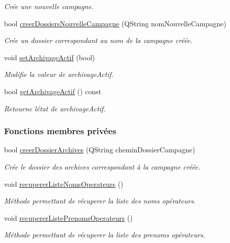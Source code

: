 \begin{DoxyCompactItemize}
\begin{DoxyCompactList}\small\item\em Crée une nouvelle campagne. \end{DoxyCompactList}\item 
bool \hyperlink{class_rov_a970f36e93f9dbd22734db571b21ceb04}{creer\+Dossiers\+Nouvelle\+Campagne} (Q\+String nom\+Nouvelle\+Campagne)
\begin{DoxyCompactList}\small\item\em Crée un dossier correspondant au nom de la campagne créée. \end{DoxyCompactList}\item 
void \hyperlink{class_rov_abbe2eb87a00b651c8259c0c7abca3edd}{set\+Archivage\+Actif} (bool)
\begin{DoxyCompactList}\small\item\em Modifie la valeur de archivage\+Actif. \end{DoxyCompactList}\item 
bool \hyperlink{class_rov_ac24b94eaac569252bdc0b1919489a761}{get\+Archivage\+Actif} () const
\begin{DoxyCompactList}\small\item\em Retourne l\textquotesingle{}état de archivage\+Actif. \end{DoxyCompactList}\end{DoxyCompactItemize}
\subsubsection*{Fonctions membres privées}
\begin{DoxyCompactItemize}
\item 
bool \hyperlink{class_rov_a53f656be57fa1eb7b93e03095a597439}{creer\+Dossier\+Archives} (Q\+String chemin\+Dossier\+Campagne)
\begin{DoxyCompactList}\small\item\em Crée le dossier des archives correspondant à la campagne créée. \end{DoxyCompactList}\item 
void \hyperlink{class_rov_a490eefb90bf28e83f181d770f0f52446}{recuperer\+Liste\+Noms\+Operateurs} ()
\begin{DoxyCompactList}\small\item\em Méthode permettant de récuperer la liste des noms opérateurs. \end{DoxyCompactList}\item 
void \hyperlink{class_rov_a84dece742f5c4c903ada4f25c869597f}{recuperer\+Liste\+Prenoms\+Operateurs} ()
\begin{DoxyCompactList}\small\item\em Méthode permettant de récuperer la liste des prenoms opérateurs. \end{DoxyCompactList}\end{DoxyCompactItemize}
